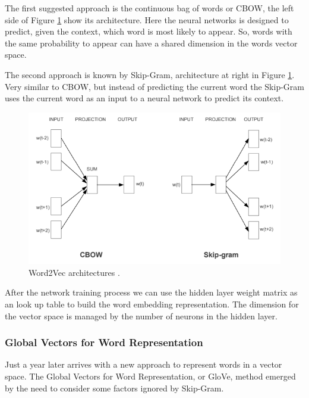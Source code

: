 	The first suggested approach is the continuous bag of words or CBOW, the left side of Figure \ref{fig:word2vecarchitectures} show its architecture. Here the neural networks is designed to predict, given the context, which word is most likely to appear. So, words with the same probability to appear can have a shared dimension in the words vector space. 

	The second approach is known by Skip-Gram, architecture at right in Figure \ref{fig:word2vecarchitectures}. Very similar to CBOW, but instead of predicting the current word the Skip-Gram uses the current word as an input to a neural network to predict its context.
	
	\begin{figure}[h!]
		\centering
		\includegraphics[width=0.85\linewidth]{01.Chapters/02.Background/word2vec_architectures}
		\caption{Word2Vec architectures \cite{mikolov2013efficient}.}
		\label{fig:word2vecarchitectures}
	\end{figure}
	
	
	After the network training process we can use the hidden layer weight matrix as an look up table to build the word embedding representation. The dimension for the vector space is managed by the number of neurons in the hidden layer. 		
	
	
	\subsubsection{Global Vectors for Word Representation} %
	
	Just a year later  arrives with a new approach to represent words in a vector space. The Global Vectors for Word Representation, or GloVe, method emerged by the need to consider some factors ignored by Skip-Gram.
		
